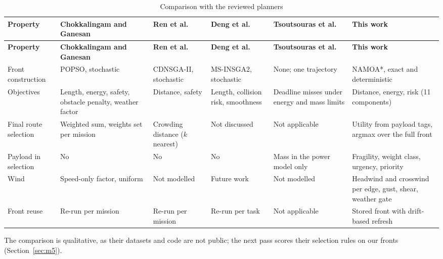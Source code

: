 \begin{footnotesize}
\begin{longtable}{|P{1.8cm}|P{2.4cm}|P{2.1cm}|P{2.1cm}|P{2.3cm}|P{2.9cm}|}
\caption{Comparison with the reviewed planners}\label{tab:compare}\\
\hline
\textbf{Property} & \textbf{Chokkalingam and Ganesan~\cite{r1}} & \textbf{Ren et al.~\cite{r3}} & \textbf{Deng et al.~\cite{r11}} & \textbf{Tsoutsouras et al.~\cite{r10}} & \textbf{This work}\\
\hline
\endfirsthead
\hline
\textbf{Property} & \textbf{Chokkalingam and Ganesan~\cite{r1}} & \textbf{Ren et al.~\cite{r3}} & \textbf{Deng et al.~\cite{r11}} & \textbf{Tsoutsouras et al.~\cite{r10}} & \textbf{This work}\\
\hline
\endhead
Front construction & POPSO, stochastic & CDNSGA-II, stochastic & MS-INSGA2, stochastic & None; one trajectory & NAMOA*, exact and deterministic\\
\hline
Objectives & Length, energy, safety, obstacle penalty, weather factor & Distance, safety & Length, collision risk, smoothness & Deadline misses under energy and mass limits & Distance, energy, risk (11 components)\\
\hline
Final route selection & Weighted sum, weights set per mission & Crowding distance ($k$ nearest) & Not discussed & Not applicable & Utility from payload tags, argmax over the full front\\
\hline
Payload in selection & No & No & No & Mass in the power model only & Fragility, weight class, urgency, priority\\
\hline
Wind & Speed-only factor, uniform & Not modelled & Future work & Not modelled & Headwind and crosswind per edge, gust, shear, weather gate\\
\hline
Front reuse & Re-run per mission & Re-run per mission & Re-run per task & Not applicable & Stored front with drift-based refresh\\
\hline
\end{longtable}
\end{footnotesize}

The comparison is qualitative, as their datasets and code are not public; the next pass
scores their selection rules on our fronts (Section~\ref{sec:m5}).
